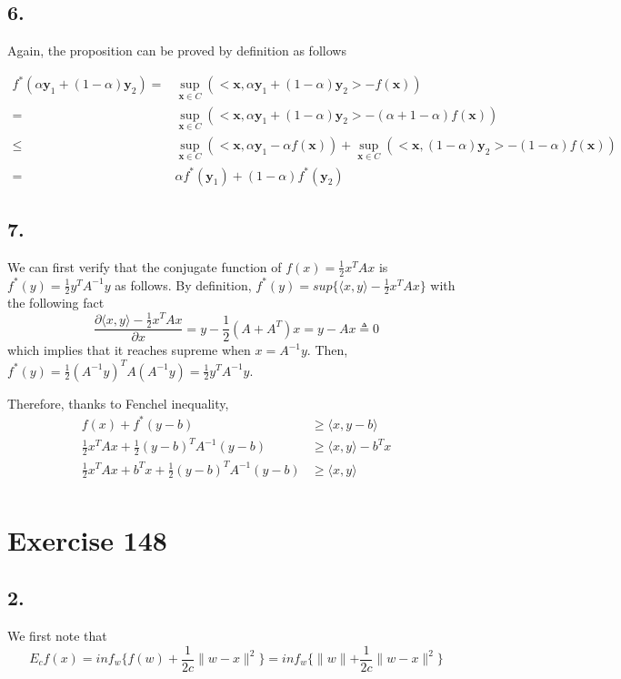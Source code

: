 \documentclass{article}
\begin{document}
\subsection{6.}
Again, the proposition can be proved by definition as follows

\begin{align*}
    f^*(\alpha \mathbf{y}_1 + (1 - \alpha) \mathbf{y}_2) = & \sup_{\mathbf{x} \in C}(<\mathbf{x}, \alpha \mathbf{y}_1 + (1 - \alpha) \mathbf{y}_2> - f(\mathbf{x})) \\
= & \sup_{\mathbf{x} \in C}(<\mathbf{x}, \alpha \mathbf{y}_1 + (1 - \alpha) \mathbf{y}_2> - (\alpha + 1 - \alpha)f(\mathbf{x})) \\
\leq & \sup_{\mathbf{x} \in C}(<\mathbf{x}, \alpha \mathbf{y}_1 - \alpha f(\mathbf{x})) + \sup_{\mathbf{x} \in C}(<\mathbf{x}, (1 - \alpha) \mathbf{y}_2> - (1 - \alpha)f(\mathbf{x})) \\
= & \alpha f^*(\mathbf{y}_1) + (1 - \alpha) f^*(\mathbf{y}_2)
\end{align*}

\subsection{7.}
We can first verify that the conjugate function of $f(x) = \frac{1}{2} x^TAx$ is $f^*(y) = \frac{1}{2} y^TA^{-1}y$ as follows. By definition, $f^*(y) = sup\{\langle x,y\rangle - \frac{1}{2}x^TAx\}$ with the following fact
$$
\frac{\partial \langle x,y\rangle -\frac{1}{2} x^TAx}{\partial x} = y - \frac{1}{2}(A+A^T)x = y - Ax \triangleq 0
$$
which implies that it reaches supreme when $x = A^{-1}y$. Then, $f^*(y) = \frac{1}{2}(A^{-1}y)^TA(A^{-1}y) = \frac{1}{2} y^TA^{-1}y$.

Therefore, thanks to Fenchel inequality,
\begin{align*}
    f(x) +f^{*}(y-b)& \geq \langle x,y-b\rangle \\
    \frac{1}{2}x^TAx + \frac{1}{2} (y-b)^TA^{-1}(y-b)& \geq \langle x,y\rangle - b^Tx \\
    \frac{1}{2}x^TAx + b^Tx  + \frac{1}{2} (y-b)^TA^{-1}(y-b)& \geq \langle x,y\rangle \\
\end{align*}

\section{Exercise 148}

\subsection{2.}
We first note that
$$E_cf(x)=inf_w\{f(w)+\frac{1}{2c}\parallel w-x \parallel^2\}=inf_w\{\parallel w \parallel +\frac{1}{2c} \parallel w-x \parallel^2\}$$ 
\end{document}
